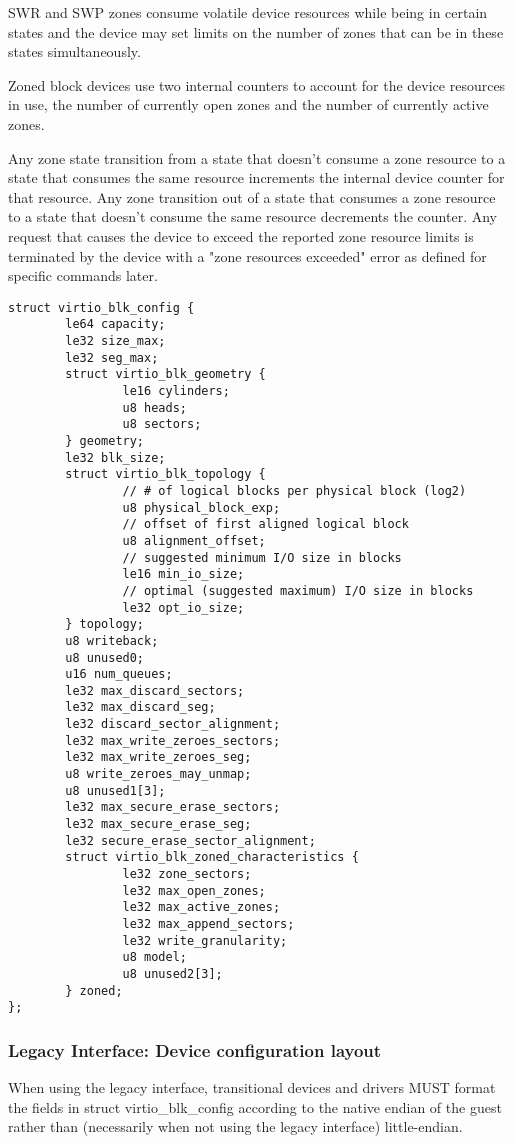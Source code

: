 SWR and SWP zones consume volatile device resources while being in certain
states and the device may set limits on the number of zones that can be in these
states simultaneously.

Zoned block devices use two internal counters to account for the device
resources in use, the number of currently open zones and the number of currently
active zones.

Any zone state transition from a state that doesn't consume a zone resource to a
state that consumes the same resource increments the internal device counter for
that resource. Any zone transition out of a state that consumes a zone resource
to a state that doesn't consume the same resource decrements the counter. Any
request that causes the device to exceed the reported zone resource limits is
terminated by the device with a "zone resources exceeded" error as defined for
specific commands later.

\begin{lstlisting}
struct virtio_blk_config {
        le64 capacity;
        le32 size_max;
        le32 seg_max;
        struct virtio_blk_geometry {
                le16 cylinders;
                u8 heads;
                u8 sectors;
        } geometry;
        le32 blk_size;
        struct virtio_blk_topology {
                // # of logical blocks per physical block (log2)
                u8 physical_block_exp;
                // offset of first aligned logical block
                u8 alignment_offset;
                // suggested minimum I/O size in blocks
                le16 min_io_size;
                // optimal (suggested maximum) I/O size in blocks
                le32 opt_io_size;
        } topology;
        u8 writeback;
        u8 unused0;
        u16 num_queues;
        le32 max_discard_sectors;
        le32 max_discard_seg;
        le32 discard_sector_alignment;
        le32 max_write_zeroes_sectors;
        le32 max_write_zeroes_seg;
        u8 write_zeroes_may_unmap;
        u8 unused1[3];
        le32 max_secure_erase_sectors;
        le32 max_secure_erase_seg;
        le32 secure_erase_sector_alignment;
        struct virtio_blk_zoned_characteristics {
                le32 zone_sectors;
                le32 max_open_zones;
                le32 max_active_zones;
                le32 max_append_sectors;
                le32 write_granularity;
                u8 model;
                u8 unused2[3];
        } zoned;
};
\end{lstlisting}


\subsubsection{Legacy Interface: Device configuration layout}\label{sec:Device Types / Block Device / Device configuration layout / Legacy Interface: Device configuration layout}
When using the legacy interface, transitional devices and drivers
MUST format the fields in struct virtio_blk_config
according to the native endian of the guest rather than
(necessarily when not using the legacy interface) little-endian.


